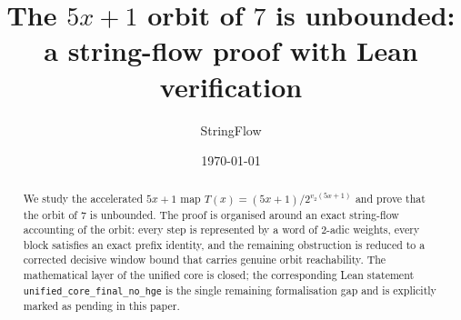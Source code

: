 \documentclass[11pt]{article}
\title{The $5x+1$ orbit of $7$ is unbounded:\\ a string-flow proof with Lean verification}
\author{StringFlow}
\date{\today}
\theoremstyle{plain}
\theoremstyle{definition}
\newcommand{\vtwo}[1]{v_2\!\left(#1\right)}
\begin{document}
\sloppy

\maketitle

\begin{abstract}
We study the accelerated $5x+1$ map
$T(x)=(5x+1)/2^{\vtwo{5x+1}}$ and prove that the orbit of $7$ is
unbounded.  The proof is organised around an exact string-flow
accounting of the orbit: every step is represented by a word of
2-adic weights, every block satisfies an exact prefix identity, and the
remaining obstruction is reduced to a corrected decisive window bound
that carries genuine orbit reachability.  The mathematical layer of the
unified core is closed; the corresponding Lean statement
\texttt{unified\_core\_final\_no\_hge} is the single remaining formalisation
gap and is explicitly marked as pending in this paper.
\end{abstract}

\tableofcontents











\end{document}
